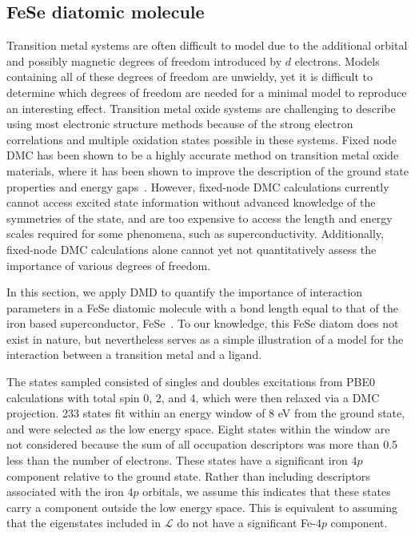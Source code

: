 \subsection{FeSe diatomic molecule}
\label{subsection:fese}
Transition metal systems are often difficult to model due to the additional orbital and possibly magnetic degrees of freedom introduced by $d$ electrons.
Models containing all of these degrees of freedom are unwieldy, yet it is difficult to determine which degrees of freedom are needed for a minimal model to reproduce an interesting effect.
Transition metal oxide systems are challenging to describe using most electronic structure methods because of the strong electron correlations and multiple oxidation states possible in these systems. 
Fixed node DMC has been shown to be a highly accurate method on transition metal oxide materials, where it has been shown to improve the description of the ground state properties and energy gaps~\cite{Foyevtsova2014, Wagner_Abbamonte, Zheng2015, Wagner2016}. %
\BDB{This sentence might be unnecessary:[[[}
However, fixed-node DMC calculations currently cannot access excited state information without advanced knowledge of the symmetries of the state, and are too expensive to access the length and energy scales required for some phenomena, such as superconductivity. 
\BDB{]]]}
Additionally, fixed-node DMC calculations alone cannot yet not quantitatively assess the importance of various degrees of freedom.

In this section, we apply DMD to quantify the importance of interaction parameters in a FeSe diatomic molecule with a bond length equal to that of the iron based superconductor, FeSe~\cite{kumar_crystal_2010}.
To our knowledge, this FeSe diatom does not exist in nature, but nevertheless serves as a simple illustration of a model for the interaction between a transition metal and a ligand. 

The states sampled consisted of singles and doubles excitations from PBE0 calculations with total spin 0, 2, and 4, which were then relaxed via a DMC projection.
233 states fit within an energy window of 8 eV from the ground state, and were selected as the low energy space.
Eight states within the window are not considered because the sum of all occupation descriptors was more than 0.5 less than the number of electrons.
These states have a significant iron $4p$ component relative to the ground state. 
Rather than including descriptors associated with the iron $4p$ orbitals, we assume this indicates that these states carry a component outside the low energy space. 
This is equivalent to assuming that the eigenstates included in $\mathcal{L}$ do not have a significant Fe-$4p$ component.
 

